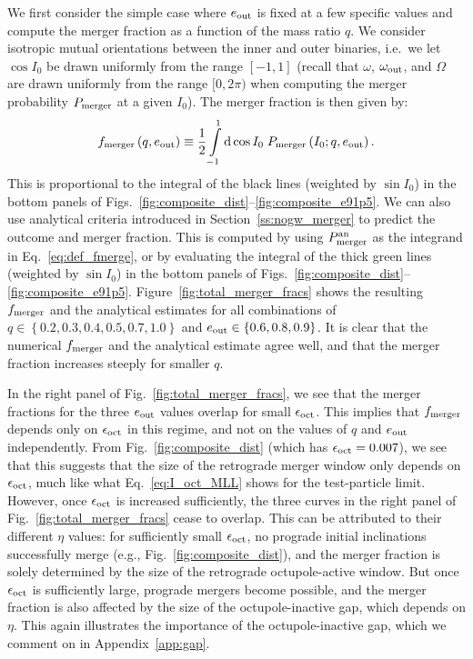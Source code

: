 \documentclass[
        fleqn,
        usenatbib,
    ]{mnras}
\newcommand*{\p}[1]{\left(#1\right)}
\newcommand*{\z}[1]{\left\{#1\right\}}
\begin{document}
We first consider the simple case where $e_{\rm out}$ is fixed at a few
specific values and compute the merger fraction as a function of the mass ratio
$q$. We consider isotropic mutual orientations between the inner and outer
binaries, i.e.\ we let $\cos I_0$ be drawn uniformly from the range $[-1, 1]$
(recall that $\omega$, $\omega_{\rm out}$, and $\Omega$ are drawn uniformly from
the range $[0, 2\pi)$ %
when computing the merger probability $P_{\rm merger}$ at a given $I_0$). The
merger fraction is then given by:
\begin{align}
    f_{\rm merger}\p{q, e_{\rm out}} \equiv
        \frac{1}{2}\int\limits_{-1}^1\mathrm{d}\cos I_0\;
            P_{\rm merger}\p{I_0; q, e_{\rm out}} .\label{eq:def_fmerge}
\end{align}
This is proportional to the integral of the black lines (weighted by $\sin I_0$)
in the bottom panels of
Figs.~\ref{fig:composite_dist}--\ref{fig:composite_e91p5}. We can also use
analytical criteria introduced in Section~\ref{ss:nogw_merger} to predict the
outcome and merger fraction. This is computed by using $P_{\rm merger}^{\rm an}$
as the integrand in Eq.~\eqref{eq:def_fmerge}, or by evaluating the integral of
the thick green lines (weighted by $\sin I_0$) in the bottom panels of
Figs.~\ref{fig:composite_dist}--\ref{fig:composite_e91p5}.
Figure~\ref{fig:total_merger_fracs} shows the resulting $f_{\rm merger}$ and the
analytical estimates for all combinations of $q \in \z{0.2, 0.3, 0.4, 0.5, 0.7,
1.0}$ and $e_{\rm out} \in \z{0.6, 0.8, 0.9}$. It is clear that the numerical
$f_{\rm merger}$ and the analytical estimate agree well, and that the merger
fraction increases steeply for smaller $q$.

In the right panel of Fig.~\ref{fig:total_merger_fracs}, we see that the merger
fractions for the three $e_{\rm out}$ values overlap for small $\epsilon_{\rm
oct}$. This implies that $f_{\rm merger}$ depends only on $\epsilon_{\rm oct}$
in this regime, and not on the values of $q$ and $e_{\rm out}$ independently.
From Fig.~\ref{fig:composite_dist} (which has $\epsilon_{\rm oct} = 0.007$), we
see that this suggests that the size of the retrograde merger window only
depends on $\epsilon_{\rm oct}$, much like what Eq.~\eqref{eq:I_oct_MLL} shows
for the test-particle limit. However, once $\epsilon_{\rm oct}$ is increased
sufficiently, the three curves in the right panel of
Fig.~\ref{fig:total_merger_fracs} cease to overlap. This can be attributed to
their different $\eta$ values: for sufficiently small $\epsilon_{\rm oct}$, no
prograde initial inclinations successfully merge (e.g.,
Fig.~\ref{fig:composite_dist}), and the merger fraction is solely determined by
the size of the retrograde octupole-active window. But once $\epsilon_{\rm oct}$
is sufficiently large, prograde mergers become possible, and the merger fraction
is also affected by the size of the octupole-inactive gap, which depends on
$\eta$. This again illustrates the importance of the octupole-inactive gap,
which we comment on in Appendix~\ref{app:gap}.
\end{document}
